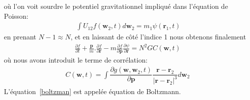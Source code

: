 où l'on voit sourdre le potentiel gravitationnel impliqué dans l'équation de Poisson:
\begin{align*}
	\displaystyle{\ \int U_{12}f\left(  \mathbf{w}_{2},t\right)  d\mathbf{w}_{2}=m_{1}\psi\left(  \mathbf{r}_{1},t\right)  }%
\end{align*}
en prenant $N-1\approx N$, et en laissant de côté l'indice 1 nous obtenons finalement
\begin{align}
	\frac{\partial f}{\partial t}+\frac{\mathbf{p}}{m}.\frac{\partial f}{\partial\mathbf{r}}-m\frac{\partial f}{\partial\mathbf{p}}\frac{\partial\psi
	}{\partial\mathbf{r}}=N^{2}GC\left(  \mathbf{w},t\right)  \label{boltzman}%
\end{align}
où nous avons introduit le terme de corrélation:
\begin{align*}
	C\left(  \mathbf{w},t\right)  =\displaystyle\int\dfrac{\partial g\left(\mathbf{w},\mathbf{w}_{2},t\right)  }{\partial\mathbf{p}}\dfrac{\mathbf{r}%
	-\mathbf{r}_{2}}{\left\vert \mathbf{r}-\mathbf{r}_{2}\right\vert ^{3}}d\mathbf{w}_{2}%
\end{align*}
L'équation~\ref{boltzman} est appelée équation de Boltzmann.


